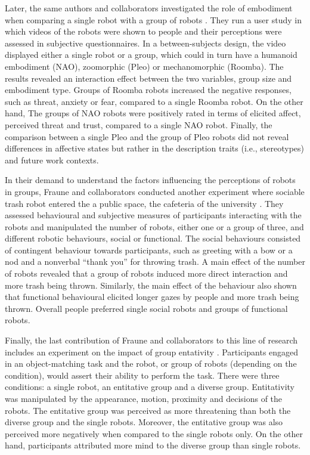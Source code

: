 Later, the same authors and collaborators investigated the role of embodiment when comparing a single robot with a group of robots \cite{fraune2015rabble}. They run a user study in which videos of the robots were shown to people and their perceptions were assessed in subjective questionnaires. In a between-subjects design, the video displayed either a single robot or a group, which could in turn have a humanoid embodiment (NAO), zoomorphic (Pleo) or mechanomorphic (Roomba). The results revealed an interaction effect between the two variables, group size and embodiment type. Groups of Roomba robots increased the negative responses, such as threat, anxiety or fear, compared to a single Roomba robot. On the other hand, The groups of NAO robots were positively rated in terms of elicited affect, perceived threat and trust, compared to a single NAO robot. Finally, the comparison between a single Pleo and the group of Pleo robots did not reveal differences in affective states but rather in the description traits (i.e., stereotypes) and future work contexts.

In their demand to understand the factors influencing the perceptions of robots in groups, Fraune and collaborators conducted another experiment where sociable trash robot entered the a public space, the cafeteria of the university \cite{fraune2015three}. They assessed behavioural and subjective measures of participants interacting with the robots and manipulated the number of robots, either one or a group of three, and different robotic behaviours, social or functional. The social behaviours consisted of contingent behaviour towards participants, such as greeting with a bow or a nod and a nonverbal ``thank you'' for throwing trash. A main effect of the number of robots revealed that a group of robots induced more direct interaction and more trash being thrown. Similarly, the main effect of the behaviour also shown that functional behavioural elicited longer gazes by people and more trash being thrown. Overall people preferred single social robots and groups of functional robots.

Finally, the last contribution of Fraune and collaborators to this line of research includes an experiment on the impact of group entativity \cite{fraune2017threatening}. Participants engaged in an object-matching task and the robot, or group of robots (depending on the condition), would assert their ability to perform the task. There were three conditions: a single robot, an entitative group and a diverse group. Entitativity was manipulated by the appearance, motion, proximity and decisions of the robots. The entitative group was perceived as more threatening than both the diverse group and the single robots. Moreover, the entitative group was also perceived more negatively when compared to the single robots only. On the other hand, participants attributed more mind to the diverse group than single robots.



